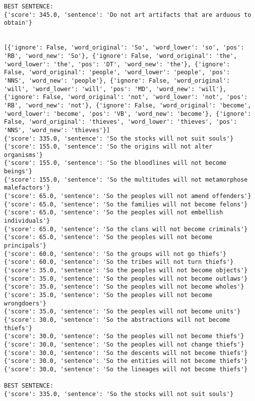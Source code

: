 \documentclass[12pt,a4paper,oneside]{book}
\begin{document}
\begin{verbatim}
BEST SENTENCE:
{'score': 345.0, 'sentence': 'Do not art artifacts that are arduous to obtain'}


[{'ignore': False, 'word_original': 'So', 'word_lower': 'so', 'pos': 'RB', 'word_new': 'So'}, {'ignore': False, 'word_original': 'the', 'word_lower': 'the', 'pos': 'DT', 'word_new': 'the'}, {'ignore': False, 'word_original': 'people', 'word_lower': 'people', 'pos': 'NNS', 'word_new': 'people'}, {'ignore': False, 'word_original': 'will', 'word_lower': 'will', 'pos': 'MD', 'word_new': 'will'}, {'ignore': False, 'word_original': 'not', 'word_lower': 'not', 'pos': 'RB', 'word_new': 'not'}, {'ignore': False, 'word_original': 'become', 'word_lower': 'become', 'pos': 'VB', 'word_new': 'become'}, {'ignore': False, 'word_original': 'thieves', 'word_lower': 'thieves', 'pos': 'NNS', 'word_new': 'thieves'}]
{'score': 335.0, 'sentence': 'So the stocks will not suit souls'}
{'score': 155.0, 'sentence': 'So the origins will not alter organisms'}
{'score': 155.0, 'sentence': 'So the bloodlines will not become beings'}
{'score': 155.0, 'sentence': 'So the multitudes will not metamorphose malefactors'}
{'score': 65.0, 'sentence': 'So the peoples will not amend offenders'}
{'score': 65.0, 'sentence': 'So the families will not become felons'}
{'score': 65.0, 'sentence': 'So the peoples will not embellish individuals'}
{'score': 65.0, 'sentence': 'So the clans will not become criminals'}
{'score': 65.0, 'sentence': 'So the peoples will not become principals'}
{'score': 60.0, 'sentence': 'So the groups will not go thiefs'}
{'score': 60.0, 'sentence': 'So the tribes will not turn thiefs'}
{'score': 35.0, 'sentence': 'So the peoples will not become objects'}
{'score': 35.0, 'sentence': 'So the peoples will not become outlaws'}
{'score': 35.0, 'sentence': 'So the peoples will not become wholes'}
{'score': 35.0, 'sentence': 'So the peoples will not become wrongdoers'}
{'score': 35.0, 'sentence': 'So the peoples will not become units'}
{'score': 30.0, 'sentence': 'So the abstractions will not become thiefs'}
{'score': 30.0, 'sentence': 'So the peoples will not become thiefs'}
{'score': 30.0, 'sentence': 'So the peoples will not change thiefs'}
{'score': 30.0, 'sentence': 'So the descents will not become thiefs'}
{'score': 30.0, 'sentence': 'So the entities will not become thiefs'}
{'score': 30.0, 'sentence': 'So the lineages will not become thiefs'}

BEST SENTENCE:
{'score': 335.0, 'sentence': 'So the stocks will not suit souls'}



\end{verbatim}
\end{document}
